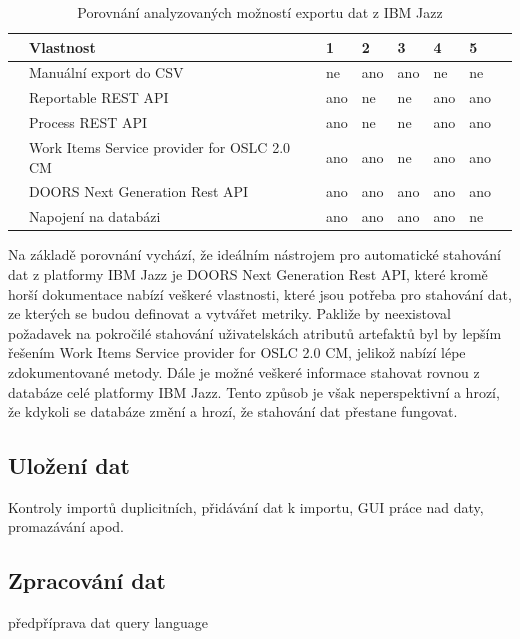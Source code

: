 \documentclass[czech,master,public,dept460,male,cpdeclaration,oneside]{diploma}
\begin{document}
\begin{table}[htp]
\centering
\begin{tabular}{@{}llllllll@{}}
\toprule
 & \textbf{Vlastnost}                          & \textbf{1} & \textbf{2} & \textbf{3} & \textbf{4} & \textbf{5} &  \\ \midrule
 & Manuální export do CSV                      & ne         & ano        & ano        & ne         & ne         &  \\
 & Reportable REST API                         & ano        & ne         & ne         & ano        & ano        &  \\
 & Process REST API                            & ano        & ne         & ne         & ano        & ano        &  \\
 & Work Items Service provider for OSLC 2.0 CM & ano        & ano        & ne         & ano        & ano        &  \\
 & DOORS Next Generation Rest API              & ano        & ano        & ano        & ano        & ano        &  \\
 & Napojení na databázi                        & ano        & ano        & ano        & ano        & ne         &  \\ \bottomrule
\end{tabular}
\caption{Porovnání analyzovaných možností exportu dat z IBM Jazz}
\label{tab:ibm_jazz_export}
\end{table}

Na základě porovnání vychází, že ideálním nástrojem pro automatické stahování dat z platformy IBM Jazz je  DOORS Next Generation Rest API, které kromě horší dokumentace nabízí veškeré vlastnosti, které jsou potřeba pro stahování dat, ze kterých se budou definovat a vytvářet metriky. Pakliže by neexistoval požadavek na pokročilé stahování uživatelskách atributů artefaktů byl by lepším řešením Work Items Service provider for OSLC 2.0 CM, jelikož nabízí lépe zdokumentované metody. Dále je možné veškeré informace stahovat rovnou z databáze celé platformy IBM Jazz. Tento způsob je však neperspektivní a hrozí, že kdykoli se databáze změní a hrozí, že stahování dat přestane fungovat.

\subsection{Uložení dat}
Kontroly importů duplicitních, přidávání dat k importu, GUI práce nad daty, promazávání apod.

\subsection{Zpracování dat}
předpříprava dat query language
\end{document}
